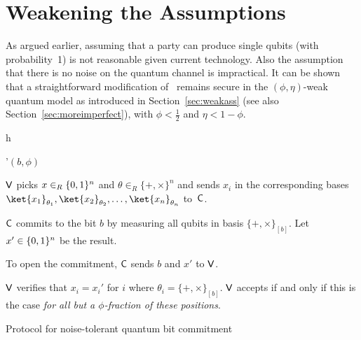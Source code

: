 


\section{Weakening the Assumptions} \label{sec:weakassumptioncomm}
As argued earlier, assuming that a party can
produce single qubits (with probability~1) is not reasonable given
current technology. Also the assumption that there is no noise on the
quantum channel is impractical.  It can be shown that a
straightforward modification of \comm\ remains secure in the
$(\phi,\eta)$-weak quantum model as introduced in
Section~\ref{sec:weakass} (see also Section~\ref{sec:moreimperfect}),
with $\phi < \frac{1}{2}$ and $\eta < 1- \phi$.

\begin{myfigure}{h}
\begin{myprotocol}{\comm'$(b,\phi)$}
\item ${\sf V}$ picks $x \in_R \{0,1\}^n$ and $\theta \in_R \{+,\times \}^n$ and
  sends $x_i$ in the corresponding bases $\ket{x_1}_{\theta_1},
  \ket{x_2}_{\theta_2}, \ldots, \ket{x_n}_{\theta_n}$ to~${\sf C}$.
 \item ${\sf C}$ commits to the bit $b$ by measuring all qubits in basis
   $\{+,\times \}_{[b]}$. Let $x' \in \{0,1\}^n$ be the result.
 \item To open the commitment, ${\sf C}$ sends $b$ and $x'$ to ${\sf V}$.
 \item ${\sf V}$ verifies that $x_i= x_i'$ for $i$ where $\theta_i = \{+,\times
   \}_{[b]}$. ${\sf V}$ accepts if and only if this is the case \emph{for all but
   a $\phi$-fraction of these positions}.
\end{myprotocol}
\caption{Protocol for noise-tolerant quantum bit commitment}\label{fig:commnoisy}
\end{myfigure}


